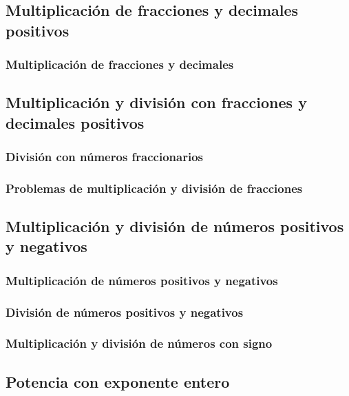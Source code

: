 \documentclass[11pt]{book}
\begin{document}
\pagestyle{empty}

\restoregeometry
\tableofcontents
\chapter{}
\pagestyle{fancy}
\section{Multiplicación de fracciones y decimales positivos}
\subsection{Multiplicación de fracciones y decimales}

\section{Multiplicación y división con fracciones y decimales positivos}
\subsection{División con números fraccionarios}
\subsection{Problemas de multiplicación y división de fracciones}

\section{Multiplicación y división de números positivos y negativos}
\subsection{Multiplicación de números positivos y negativos}
\subsection{División de números positivos y negativos}
\subsection{Multiplicación y división de números con signo}

\section{Potencia con exponente entero}
\end{document}
